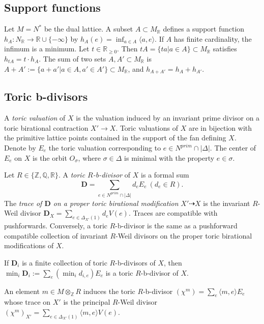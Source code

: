 \documentclass[12pt,twoside]{amsart}
\newcommand{\Q}{{\mathbb Q}}
\newcommand{\Z}{{\mathbb Z}}
\newcommand{\R}{{\mathbb R}}
\newcommand{\bD}{{\mathbf D}}
\theoremstyle{plain}
\theoremstyle{definition}
\theoremstyle{remark}
\begin{document}

\subsection{Support functions}


Let $M=N^*$ be the dual lattice. A subset $A\subset M_\R$ defines
a support function $h_A\colon N_\R \to \R \cup\{-\infty\}$ by $h_A(e)=\inf_{a\in A}\langle a,e\rangle$.
If $A$ has finite cardinality, the infimum is a minimum.
Let $t\in \R_{\ge 0}$. Then $tA=\{ta|a\in A \}\subset M_\R$ satisfies $h_{tA}=t\cdot h_A$.
The sum of two sets $A,A'\subset M_\R$ is $A+A':=\{a+a'| a\in A,a'\in A'\}\subset M_\R$,
and $h_{A+A'}=h_A+h_{A'}$.


\subsection{Toric b-divisors}

 A {\em toric valuation} of $X$ is the valuation
induced by an invariant prime divisor on a toric birational contraction $X'\to X$.
Toric valuations of $X$ are in bijection with the primitive lattice points contained
in the support of the fan defining $X$. Denote by $E_e$ the toric valuation corresponding to 
$e\in N^{prim}\cap |\Delta|$. The center of $E_e$ on $X$ is the orbit $O_\sigma$, where 
$\sigma\in \Delta$ is minimal with the property $e\in \sigma$.

Let $R\in \{\Z,\Q,\R\}$. A {\em toric $R$-b-divisor} of $X$ is a formal sum 
$$
\bD=\sum_{e\in N^{prim}\cap |\Delta|} d_e E_e\ (d_e\in R).
$$
The {\em trace of $\bD$ on a proper toric birational modification} $X'\dashrightarrow X$ 
is the invariant $R$-Weil divisor $\bD_X=\sum_{e \in \Delta_{X'}(1)} d_e V(e)$.
Traces are compatible with pushforwards. Conversely, a toric $R$-b-divisor is the same
as a pushforward compatible collection of invariant $R$-Weil divisors on the proper toric
birational modifications of $X$.

If $\bD_i$ is a finite collection of toric $R$-b-divisors of $X$, then 
$\min_i \bD_i:=\sum_e (\min_i d_{i,e}) E_e$ is a toric $R$-b-divisor of $X$.

An element $m\in M\otimes_\Z R$ induces the toric $R$-b-divisor $(\chi^m)=\sum_e \langle m,e\rangle E_e$
whose trace on $X'$ is the principal $R$-Weil divisor 
$(\chi^m)_{X'}=\sum_{e\in \Delta_{X'}(1)}  \langle m,e\rangle V(e)$.
\end{document}
